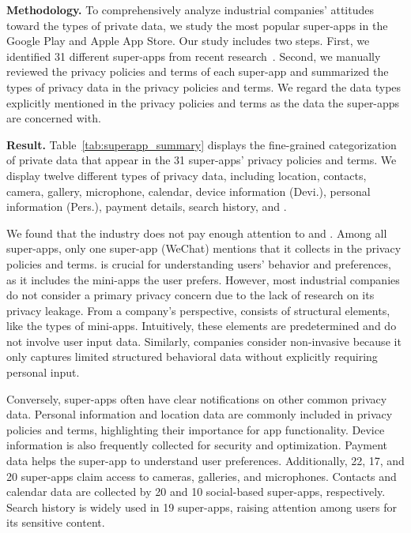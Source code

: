 \textbf{Methodology.}
To comprehensively analyze industrial companies' attitudes toward the types of private data, we study the most popular super-apps in the Google Play and Apple App Store. 
Our study includes two steps. First, we identified 31 different super-apps from recent research~\cite{yang2022cross,10.5555/3620237.3620608,zhang2022identity}. Second, we manually reviewed the privacy policies and terms of each super-app and summarized the types of privacy data in the privacy policies and terms. We regard the data types explicitly mentioned in the privacy policies and terms as the data the super-apps are concerned with. 

\noindent \textbf{Result.}
Table~\ref{tab:superapp_summary} displays the fine-grained categorization of private data that appear in the 31 super-apps' privacy policies and terms. We display twelve different types of privacy data,
including location, contacts, camera, gallery, microphone,
calendar, device information (Devi.),
personal information (Pers.), payment details, search history, \mini and \op.



We found that the industry does not pay enough attention to
\mini and \op. 
% 
Among all super-apps, only one super-app (WeChat)
mentions that it collects \mini in the privacy policies and terms. \mini is
crucial for understanding users' behavior and preferences, as it includes the
mini-apps the user prefers. However, most industrial companies do not
consider \mini a primary privacy concern due to the lack of research on
its privacy leakage. From a company's perspective, \mini consists of structural elements, like the
types of mini-apps. Intuitively, these elements are predetermined and do not involve
user input data. 
% 
Similarly, companies consider \op non-invasive because it only
captures limited structured behavioral data without explicitly requiring personal input. 


Conversely, super-apps often have clear notifications on other
common privacy data. Personal information and location data are commonly
included in privacy policies and terms, highlighting their importance for app
functionality. Device information is also frequently collected for security and
optimization. Payment data helps the super-app to understand user
preferences. Additionally, 22, 17, and 20 super-apps claim access to cameras, galleries,
and microphones. Contacts and calendar data are collected by 20 and 10 social-based super-apps, respectively. Search history is widely used in 19 super-apps, raising attention among users for its sensitive content.



